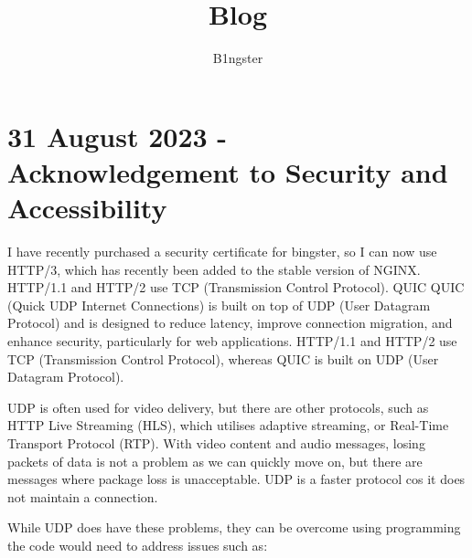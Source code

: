 \documentclass{article}
\title{Blog}
\author{B1ngster}
\date{}
\begin{document}
\maketitle
\newpage


\tableofcontents
\newpage


\section*{31 August 2023 - \\ Acknowledgement to Security and Accessibility}



I have recently purchased a security certificate for bingster, so I can now use HTTP/3, which has recently been added to the stable version of NGINX.   HTTP/1.1 and HTTP/2 use TCP (Transmission Control Protocol). QUIC QUIC (Quick UDP Internet Connections)  is built on top of UDP (User Datagram Protocol) and is designed to reduce latency, improve connection migration, and enhance security, particularly for web applications. HTTP/1.1 and HTTP/2 use TCP (Transmission Control Protocol), whereas QUIC is built on UDP (User Datagram Protocol). 

UDP is often used for video delivery, but there are other protocols, such as HTTP Live Streaming (HLS), which utilises adaptive streaming, or Real-Time Transport Protocol (RTP). With video content and audio messages, losing packets of data is not a problem as we can quickly move on, but there are messages where package loss is unacceptable. UDP is a faster protocol cos it does not maintain a connection. 

While UDP does have these problems, they can be overcome using programming the code would need to address issues such as:
\end{document}
